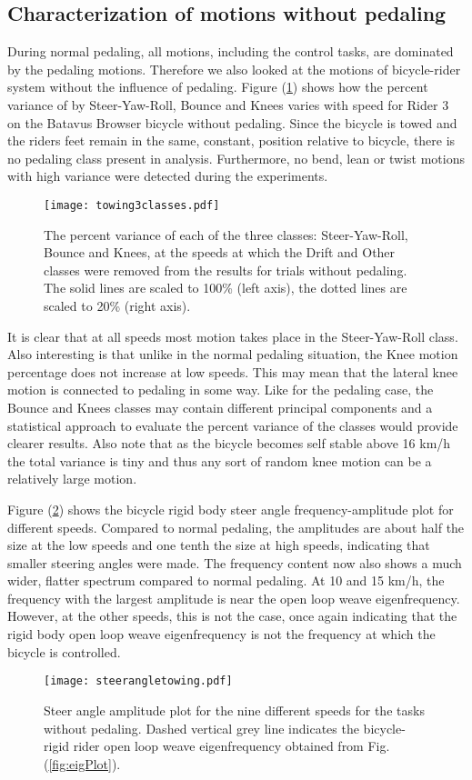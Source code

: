 \documentclass[smallextended]{svjour3}     %
\begin{document}
\subsection{Characterization of motions without pedaling}
\label{sec:noPed}
During normal pedaling, all motions, including the control tasks, are dominated by
the pedaling motions. Therefore we also looked at the motions of bicycle-rider
system without the influence of pedaling. Figure (\ref{missjellybean}) shows
how the percent variance of by Steer-Yaw-Roll, Bounce and Knees
varies with speed for Rider 3 on the Batavus Browser bicycle without pedaling. Since the bicycle
is towed and the riders feet remain in the
same, constant, position relative to bicycle, there is no pedaling class
present in analysis. Furthermore, no bend, lean or twist motions with high
variance were detected during the experiments.
\begin{figure}[tb]
    \centering
        \texttt{[image: towing3classes.pdf]}\\
    \caption{The percent variance of each of the three classes:
    Steer-Yaw-Roll, Bounce and Knees, at the speeds at which the Drift
    and Other classes were removed from the results for trials without
    pedaling. The solid lines are scaled to 100\% (left axis), the dotted lines
    are scaled to 20\% (right axis).}
    \label{missjellybean}
\end{figure}
It is clear that at all speeds most motion takes place in the Steer-Yaw-Roll
class. Also interesting is that unlike in the normal pedaling situation, the
Knee motion percentage does not increase at low speeds. This may mean that the
lateral knee motion is connected to pedaling in some way. Like for the pedaling
case, the Bounce and Knees classes may contain different principal components
and a statistical approach to evaluate the percent variance of the classes
would provide clearer results. Also note that as the bicycle becomes self
stable above 16 km/h the total variance is tiny and thus any sort of random
knee motion can be a relatively large motion.

Figure (\ref{towingsteerangle}) shows the bicycle rigid body steer angle
frequency-amplitude plot for different speeds. Compared to normal pedaling,
the amplitudes are about half the size at the low speeds and one tenth the size
at high speeds, indicating that smaller steering angles were made. The
frequency content now also shows a much wider, flatter spectrum compared to
normal pedaling. At 10 and 15 km/h, the frequency with the largest amplitude is
near the open loop weave eigenfrequency. However, at the other speeds, this is
not the case, once again indicating that the rigid body open loop weave
eigenfrequency is not the frequency at which the bicycle is controlled.
\begin{figure}[tbp]
    \centering
        \texttt{[image: steerangletowing.pdf]}\\
    \caption{Steer angle amplitude plot for the nine different speeds for the
    tasks without pedaling. Dashed vertical grey line indicates the
    bicycle-rigid rider open loop weave eigenfrequency obtained from Fig.
    (\ref{fig:eigPlot}).}
    \label{towingsteerangle}
\end{figure}
\end{document}
